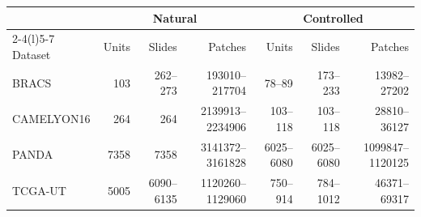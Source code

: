 \documentclass[11pt]{article}
\begin{document}
\begin{table}[htbp]
  \centering
  \footnotesize
  \setlength{\tabcolsep}{3.5pt}
  \begin{tabular}{@{}lrrrrrr@{}}
    \toprule
    & \multicolumn{3}{c}{Natural} & \multicolumn{3}{c}{Controlled} \\
    \cmidrule(lr){2-4}\cmidrule(l){5-7}
    Dataset & Units & Slides & Patches & Units & Slides & Patches \\
    \midrule
    BRACS & \num{103} & \num{262}--\num{273} & \num{193010}--\num{217704} & \num{78}--\num{89} & \num{173}--\num{233} & \num{13982}--\num{27202} \\
    CAMELYON16 & \num{264} & \num{264} & \num{2139913}--\num{2234906} & \num{103}--\num{118} & \num{103}--\num{118} & \num{28810}--\num{36127} \\
    PANDA & \num{7358} & \num{7358} & \num{3141372}--\num{3161828} & \num{6025}--\num{6080} & \num{6025}--\num{6080} & \num{1099847}--\num{1120125} \\
    TCGA-UT & \num{5005} & \num{6090}--\num{6135} & \num{1120260}--\num{1129060} & \num{750}--\num{914} & \num{784}--\num{1012} & \num{46371}--\num{69317} \\
    \bottomrule
  \end{tabular}
  \vspace{0.8em}


\end{table}
\end{document}
